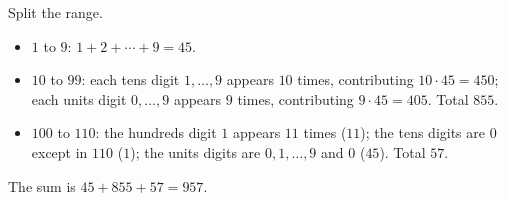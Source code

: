 Split the range.
\begin{itemize}
\item $1$ to $9$: $1+2+\cdots+9=45$.
\item $10$ to $99$: each tens digit $1,\dots,9$ appears $10$ times, contributing $10\cdot45=450$; each units digit $0,\dots,9$ appears $9$ times, contributing $9\cdot45=405$. Total $855$.
\item $100$ to $110$: the hundreds digit $1$ appears $11$ times ($11$); the tens digits are $0$ except in $110$ ($1$); the units digits are $0,1,\dots,9$ and $0$ ($45$). Total $57$.
\end{itemize}
The sum is $45+855+57=\boxed{957}$.
